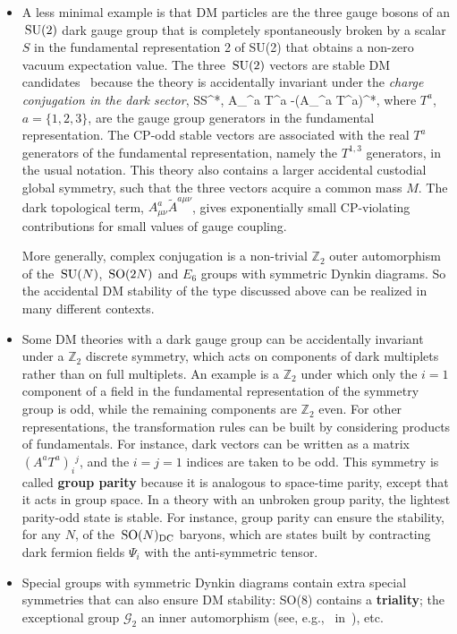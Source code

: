 \begin{itemize}
\item[$\blacktriangleright$] 
A less minimal example is that DM particles are the three gauge bosons of an $\,{\rm SU}(2) $ dark gauge group that is 
completely spontaneously broken by a scalar $S$ in the fundamental representation 2 of SU(2) 
that obtains a non-zero vacuum expectation value.
The three $\,{\rm SU}(2)$ vectors are stable DM candidates~\cite{VectorDM} 
because the theory is accidentally invariant under the {\em charge conjugation
in the dark sector}, 
\beq S\to S^*, \qquad A_\mu^a T^a \to -(A_\mu^a T^a)^*,\eeq 
where $T^a$,  $a=\{1,2,3\}$, are the gauge group generators in the fundamental representation.
The CP-odd stable vectors are associated with the real $T^a$ generators of the fundamental representation,
namely the $T^{1,3}$ generators, in the usual notation.
This theory also contains a larger accidental custodial global  symmetry, 
such that the three vectors acquire a common mass $M$.
The dark topological term, $A_{\mu\nu}^a\tilde A^{a\mu\nu}$, gives exponentially small CP-violating contributions for small values of gauge coupling.

More generally, complex conjugation is a non-trivial
$\mathbb{Z}_2$ outer automorphism of the $\,{\rm SU}(N)$, $\,{\rm SO}(2N)$ and $E_6$ groups
with symmetric Dynkin diagrams.
So the accidental DM stability of the type discussed above can be realized in many different contexts.


\item[$\blacktriangleright$]
Some DM theories with a dark gauge group
can be accidentally invariant under a $\mathbb{Z}_2$
discrete symmetry, which acts on components of dark multiplets rather than on full multiplets. An example is a $\mathbb{Z}_2$ under which
only the $i=1$ component of a field in the fundamental representation of the symmetry group is odd, 
while the remaining components are $\mathbb{Z}_2$ even. For other representations, the transformation rules can be built by considering products of fundamentals. 
For instance, dark vectors can be written as a matrix $(A^a T^a)_i{}^j$, and the $i=j=1$ indices are taken to be odd.
This symmetry is called {\bf group parity} because it is analogous to space-time parity,
except that it acts in group space.
In a theory with an unbroken group parity, the lightest parity-odd state is stable.
For instance, group parity can ensure the stability, for any $N$, of  the $\,{\rm SO}(N)_{\rm DC}$ baryons, 
which are states built by contracting dark fermion fields $\Psi_i$ with the anti-symmetric tensor.

\item[$\blacktriangleright$] Special groups with symmetric Dynkin diagrams contain extra special symmetries that can also ensure DM stability:
SO(8) contains a {\bf triality}; the  exceptional group $\mathcal{G}_2$ an  inner automorphism
(see, e.g.,~ in~\cite{VectorDM}), etc. 
\end{itemize}
 

